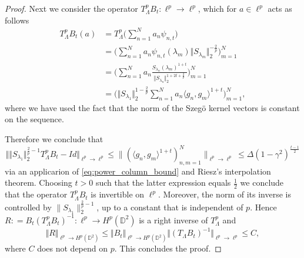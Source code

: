 \documentclass[10pt,a4paper]{amsart}
\begin{document}
\begin{proof}
Next we consider the operator $T_\Lambda^p B_t : \ell^p \to \ell^p$, which for $a\in \ell^p$ acts as follows 
\begin{align*}
	T_\Lambda^p B_t (a) & = T_\Lambda^p \Big ( \sum_{n=1}^N a_n \psi_{n,t} \Big) \\
			    & = \Big( \sum_{n=1}^N a_n \psi_{n,t}(\lambda_m) \Vert S_{\lambda_m}\Vert_2^{-\frac2p} \Big)_{m=1}^N  \\
			    & =  \Big( \sum_{n=1}^N a_n \frac{S_{\lambda_n}(\lambda_m)^{1+t}}{\Vert S_{\lambda_n}\Vert_2^{1+2t+\frac2p}}   \Big)_{m=1}^N \\
			    & =  \Big( \Vert S_{\lambda_1}\Vert_2^{1-\frac2p} \sum_{n=1}^N a_n \langle g_n, g_m \rangle^{1+t}  \Big)_{m=1}^N,
\end{align*}
where we have used the fact that the norm of the Szeg\"o kernel vectors is constant on the sequence.  

Therefore we conclude that 
\[
\Vert \Vert S_{\lambda_1}\Vert_2^{\frac2p-1} T_\Lambda^p B_t - Id \Vert_{\ell^p\to \ell^p } \leq \|(\langle g_n, g_m\rangle^{1+t})_{n, m=1}^N\|_{\ell^p\to\ell^p}\leq \Delta(1-\gamma^2)^{\frac{t-1}{2}} 
\]
via an applicarion of \eqref{eq:power_column_bound} and Riesz's interpolation theorem.
Choosing $t>0$ such that the latter expression equals $ \frac12 $ we conclude that the operator $T_\Lambda^pB_t $ is invertible on $\ell^p $. Moreover, the norm of its inverse is controlled by $\|S_{\lambda_1}\|^{\frac{2}{p}-1}_{2}$, up to a constant that is independent of $p$. Hence $R : = B_t(T_\Lambda^p B_t)^{-1} : \ell^p \to H^p(\mathbb{D}^2) $ is a right inverse of $T_\Lambda^p  $ and
\[ \Vert R \Vert_{\ell^p \to H^p(\mathbb{D}^2)} \leq \Vert B_t\Vert_{\ell^p \to H^p(\mathbb{D}^2)} \Vert (T_\Lambda B_t)^{-1}\Vert_{\ell^p\to \ell^p}\leq C, \]
where $C$ does not depend on $p$. This concludes the proof.
\end{proof}
\end{document}
